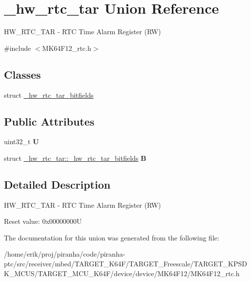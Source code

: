 \hypertarget{union__hw__rtc__tar}{}\section{\+\_\+hw\+\_\+rtc\+\_\+tar Union Reference}
\label{union__hw__rtc__tar}


H\+W\+\_\+\+R\+T\+C\+\_\+\+T\+AR -\/ R\+TC Time Alarm Register (RW)  




{\ttfamily \#include $<$M\+K64\+F12\+\_\+rtc.\+h$>$}

\subsection*{Classes}
\begin{DoxyCompactItemize}
\item 
struct \hyperlink{struct__hw__rtc__tar_1_1__hw__rtc__tar__bitfields}{\+\_\+hw\+\_\+rtc\+\_\+tar\+\_\+bitfields}
\end{DoxyCompactItemize}
\subsection*{Public Attributes}
\begin{DoxyCompactItemize}
\item 
uint32\+\_\+t {\bfseries U}\hypertarget{union__hw__rtc__tar_ab7764252dffa913b1197e0cf7acc823a}{}\label{union__hw__rtc__tar_ab7764252dffa913b1197e0cf7acc823a}

\item 
struct \hyperlink{struct__hw__rtc__tar_1_1__hw__rtc__tar__bitfields}{\+\_\+hw\+\_\+rtc\+\_\+tar\+::\+\_\+hw\+\_\+rtc\+\_\+tar\+\_\+bitfields} {\bfseries B}\hypertarget{union__hw__rtc__tar_a97c61eac719f102487e750207d38a962}{}\label{union__hw__rtc__tar_a97c61eac719f102487e750207d38a962}

\end{DoxyCompactItemize}


\subsection{Detailed Description}
H\+W\+\_\+\+R\+T\+C\+\_\+\+T\+AR -\/ R\+TC Time Alarm Register (RW) 

Reset value\+: 0x00000000U 

The documentation for this union was generated from the following file\+:\begin{DoxyCompactItemize}
\item 
/home/erik/proj/piranha/code/piranha-\/ptc/src/receiver/mbed/\+T\+A\+R\+G\+E\+T\+\_\+\+K64\+F/\+T\+A\+R\+G\+E\+T\+\_\+\+Freescale/\+T\+A\+R\+G\+E\+T\+\_\+\+K\+P\+S\+D\+K\+\_\+\+M\+C\+U\+S/\+T\+A\+R\+G\+E\+T\+\_\+\+M\+C\+U\+\_\+\+K64\+F/device/device/\+M\+K64\+F12/M\+K64\+F12\+\_\+rtc.\+h\end{DoxyCompactItemize}
